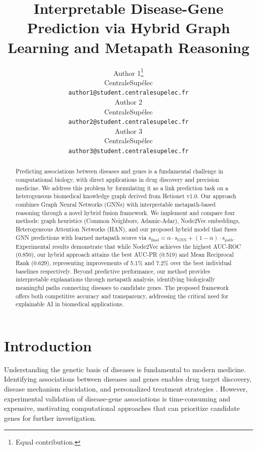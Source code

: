 \documentclass{article}
\title{Interpretable Disease-Gene Prediction via Hybrid Graph Learning and Metapath Reasoning}
\author{
Author 1\thanks{Equal contribution.} \\
CentraleSup\'elec\\
\texttt{author1@student.centralesupelec.fr} \\
\And
Author 2\footnotemark[1] \\
CentraleSup\'elec\\
\texttt{author2@student.centralesupelec.fr} \\
\And
Author 3\footnotemark[1] \\
CentraleSup\'elec\\
\texttt{author3@student.centralesupelec.fr} \\
}
\begin{document}
\maketitle

\begin{abstract}
Predicting associations between diseases and genes is a fundamental challenge in computational biology, with direct applications in drug discovery and precision medicine. We address this problem by formulating it as a link prediction task on a heterogeneous biomedical knowledge graph derived from Hetionet v1.0. Our approach combines Graph Neural Networks (GNNs) with interpretable metapath-based reasoning through a novel hybrid fusion framework. We implement and compare four methods: graph heuristics (Common Neighbors, Adamic-Adar), Node2Vec embeddings, Heterogeneous Attention Networks (HAN), and our proposed hybrid model that fuses GNN predictions with learned metapath scores via $s_{\text{final}} = \alpha \cdot s_{\text{GNN}} + (1-\alpha) \cdot s_{\text{path}}$. Experimental results demonstrate that while Node2Vec achieves the highest AUC-ROC (0.850), our hybrid approach attains the best AUC-PR (0.519) and Mean Reciprocal Rank (0.629), representing improvements of 5.1\% and 7.2\% over the best individual baselines respectively. Beyond predictive performance, our method provides interpretable explanations through metapath analysis, identifying biologically meaningful paths connecting diseases to candidate genes. The proposed framework offers both competitive accuracy and transparency, addressing the critical need for explainable AI in biomedical applications.
\end{abstract}

\section{Introduction}
\label{sec:intro}

Understanding the genetic basis of diseases is fundamental to modern medicine. Identifying associations between diseases and genes enables drug target discovery, disease mechanism elucidation, and personalized treatment strategies \citep{barabasi2011network}. However, experimental validation of disease-gene associations is time-consuming and expensive, motivating computational approaches that can prioritize candidate genes for further investigation.
\end{document}
